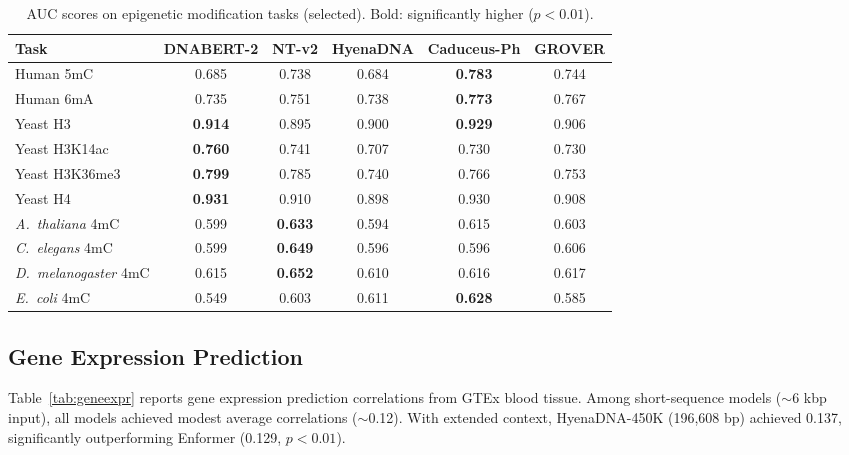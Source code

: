 \documentclass[11pt]{article}
\begin{document}
\begin{table}[ht]
\centering
\caption{AUC scores on epigenetic modification tasks (selected). Bold: significantly higher ($p < 0.01$).}
\label{tab:epigenetic}
\begin{adjustbox}{max width=\textwidth}
\begin{tabular}{@{}lccccc@{}}
\toprule
Task & DNABERT-2 & NT-v2 & HyenaDNA & Caduceus-Ph & GROVER \\
\midrule
Human 5mC & 0.685 & 0.738 & 0.684 & \textbf{0.783} & 0.744 \\
Human 6mA & 0.735 & 0.751 & 0.738 & \textbf{0.773} & 0.767 \\
Yeast H3 & \textbf{0.914} & 0.895 & 0.900 & \textbf{0.929} & 0.906 \\
Yeast H3K14ac & \textbf{0.760} & 0.741 & 0.707 & 0.730 & 0.730 \\
Yeast H3K36me3 & \textbf{0.799} & 0.785 & 0.740 & 0.766 & 0.753 \\
Yeast H4 & \textbf{0.931} & 0.910 & 0.898 & 0.930 & 0.908 \\
\emph{A.\ thaliana} 4mC & 0.599 & \textbf{0.633} & 0.594 & 0.615 & 0.603 \\
\emph{C.\ elegans} 4mC & 0.599 & \textbf{0.649} & 0.596 & 0.596 & 0.606 \\
\emph{D.\ melanogaster} 4mC & 0.615 & \textbf{0.652} & 0.610 & 0.616 & 0.617 \\
\emph{E.\ coli} 4mC & 0.549 & 0.603 & 0.611 & \textbf{0.628} & 0.585 \\
\bottomrule
\end{tabular}
\end{adjustbox}
\end{table}

\subsection{Gene Expression Prediction}

Table~\ref{tab:geneexpr} reports gene expression prediction correlations from GTEx blood tissue.  Among short-sequence models ($\sim$6 kbp input), all models achieved modest average correlations ($\sim$0.12).  With extended context, HyenaDNA-450K (196,608 bp) achieved 0.137, significantly outperforming Enformer (0.129, $p < 0.01$).
\end{document}
